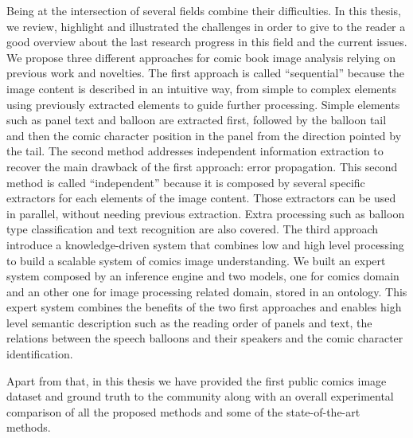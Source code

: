 Being at the intersection of several fields combine their difficulties.
In this thesis, we review, highlight and illustrated the challenges in order to give to the reader a good overview about the last research progress in this field and the current issues.
We propose three different approaches for comic book image analysis relying on previous work and novelties.
The first approach is called ``sequential'' because the image content is described in an intuitive way, from simple to complex elements using previously extracted elements to guide further processing.
Simple elements such as panel text and balloon are extracted first, followed by the balloon tail and then the comic character position in the panel from the direction pointed by the tail.
The second method addresses independent information extraction to recover the main drawback of the first approach: error propagation.
This second method is called ``independent'' because it is composed by several specific extractors for each elements of the image content.
Those extractors can be used in parallel, without needing previous extraction.
Extra processing such as balloon type classification and text recognition are also covered.
The third approach introduce a knowledge-driven system that combines low and high level processing to build a scalable system of comics image understanding.
We built an expert system composed by an inference engine and two models, one for comics domain and an other one for image processing related domain, stored in an ontology.
This expert system combines the benefits of the two first approaches and enables high level semantic description such as the reading order of panels and text, the relations between the speech balloons and their speakers and the comic character identification.

Apart from that, in this thesis we have provided the first public comics image dataset and ground truth to the community along with an overall experimental comparison of all the proposed methods and some of the state-of-the-art methods.



